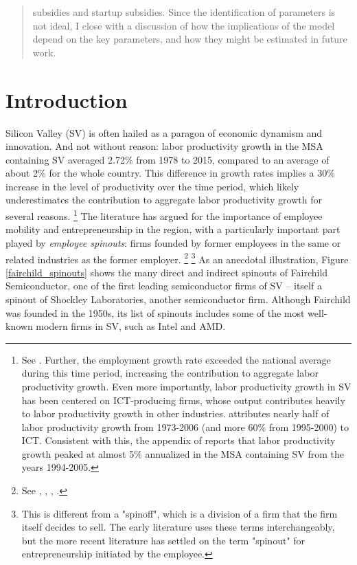 \documentclass[12pt,english]{article}
\theoremstyle{remark}
\begin{document}
\begin{abstract}
subsidies and startup subsidies. Since the identification of parameters is not ideal, I close with a discussion of how the implications of the model depend on the key parameters, and how they might be estimated in future work. 
	
\end{abstract}

\section{Introduction}



Silicon Valley (SV) is often hailed as a paragon of economic dynamism and innovation. And not without reason: labor productivity growth in the MSA containing SV averaged 2.72\% from 1978 to 2015, compared to an average of about 2\% for the whole country. This difference in growth rates implies a 30\% increase in the level of productivity over the time period, which likely underestimates the contribution to aggregate labor productivity growth for several reasons. \footnote{See \cite{parilla_understanding_2017}. Further, the employment growth rate exceeded the national average during this time period, increasing the contribution to aggregate labor productivity growth. Even more importantly, labor productivity growth in SV has been centered on ICT-producing firms, whose output contributes heavily to labor productivity growth in other industries. \cite{jorgenson_retrospective_2008} attributes nearly half of labor productivity growth from 1973-2006 (and more 60\% from 1995-2000) to ICT. Consistent with this, the appendix of  \cite{parilla_understanding_2017} reports that labor productivity growth peaked at almost 5\% annualized in the MSA containing SV from the years 1994-2005.} The literature has argued for the importance of employee mobility and entrepreneurship in the region, with a particularly important part played by \textit{employee spinouts}: firms founded by former employees in the same or related industries as the former employer. \footnote{See \cite{saxenian_regional_1994}, \cite{gilson_legal_1999}, \cite{fallick_job-hopping_2006}, \cite{franco_covenants_2008}.} \footnote{This is different from a "spinoff", which is a division of a firm that the firm itself decides to sell. The early literature uses these terms interchangeably, but the more recent literature has settled on the term "spinout" for entrepreneurship initiated by the employee.} As an anecdotal illustration, Figure \ref{fairchild_spinouts} shows the many direct and indirect spinouts of Fairchild Semiconductor, one of the first leading semiconductor firms of SV -- itself a spinout of Shockley Laboratories, another semiconductor firm. Although Fairchild was founded in the 1950s, its list of spinouts includes some of the most well-known modern firms in SV, such as Intel and AMD. 
\end{document}
